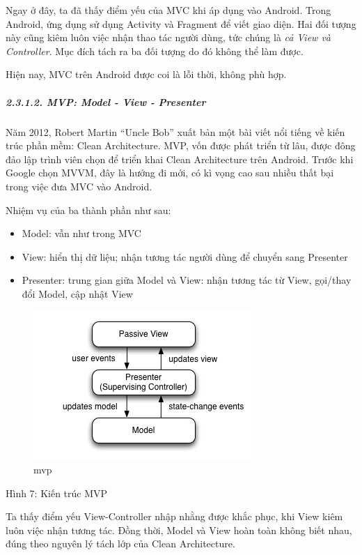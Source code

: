\documentclass[
]{article}
\begin{document}
Ngay ở đây, ta đã thấy điểm yếu của MVC khi áp dụng vào Android. Trong
Android, ứng dụng sử dụng Activity và Fragment để viết giao diện. Hai
đối tượng này cũng kiêm luôn việc nhận thao tác người dùng, tức chúng là
\emph{cả View và Controller}. Mục đích tách ra ba đối tượng do đó không
thể làm được.

Hiện nay, MVC trên Android được coi là lỗi thời, không phù hợp.

\hypertarget{mvp-model---view---presenter}{%
\subparagraph{2.3.1.2. MVP: Model - View -
Presenter}\label{mvp-model---view---presenter}}

Năm 2012, Robert Martin ``Uncle Bob'' xuất bản một bài viết nổi tiếng về
kiến trúc phần mềm: Clean Architecture. MVP, vốn được phát triển từ lâu,
được đông đảo lập trình viên chọn để triển khai Clean Architecture trên
Android. Trước khi Google chọn MVVM, đây là hướng đi mới, có kì vọng cao
sau nhiều thất bại trong việc đưa MVC vào Android.

Nhiệm vụ của ba thành phần như sau:

\begin{itemize}
\item
  Model: vẫn như trong MVC
\item
  View: hiển thị dữ liệu; nhận tương tác người dùng để chuyển sang
  Presenter
\item
  Presenter: trung gian giữa Model và View: nhận tương tác từ View,
  gọi/thay đổi Model, cập nhật View
\end{itemize}

\begin{figure}
\centering
\includegraphics{../images/Model_View_Presenter_GUI_Design_Pattern.png}
\caption{mvp}
\end{figure}

Hình 7: Kiến trúc MVP

Ta thấy điểm yếu View-Controller nhập nhằng được khắc phục, khi View
kiêm luôn việc nhận tương tác. Đồng thời, Model và View hoàn toàn không
biết nhau, đúng theo nguyên lý tách lớp của Clean Architecture.
\end{document}

